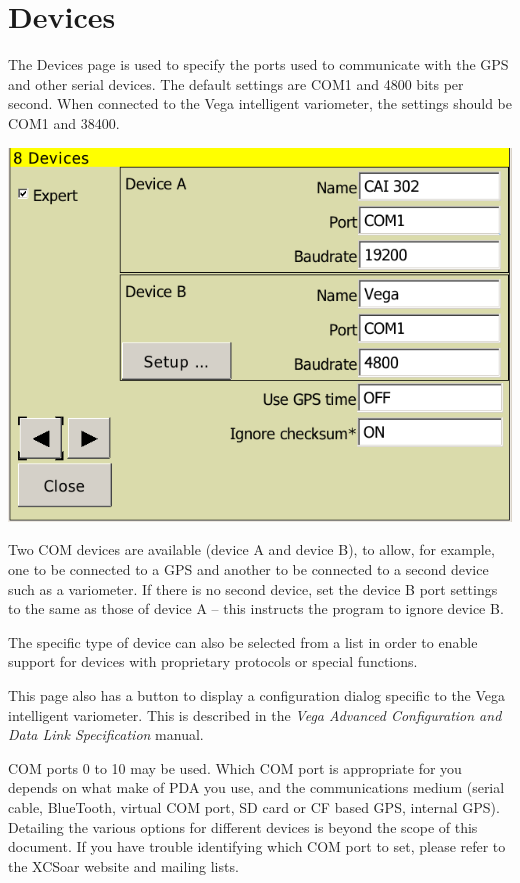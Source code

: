 \documentclass[a4paper,12pt]{refrep}
\begin{document}
\clearpage
\section{Devices}

The Devices page is used to specify the ports used to communicate with
the GPS and other serial devices. The default settings are COM1 and
4800 bits per second.  When connected to the Vega intelligent
variometer, the settings should be COM1 and 38400.

\begin{center}
\includegraphics[angle=0,width=\linewidth,keepaspectratio='true']{figures/config-6.png}
\end{center}

Two COM devices are available (device A and device B), to allow, for
example, one to be connected to a GPS and another to be connected to a
second device such as a variometer.  If there is no second device, set
the device B port settings to the same as those of device A -- this
instructs the program to ignore device B.

The specific type of device can also be selected from a list in order
to enable support for devices with proprietary protocols or special
functions.

This page also has a  button to display a
configuration dialog specific to the Vega intelligent variometer.
This is described in the {\em Vega Advanced Configuration and Data
Link Specification} manual.

COM ports 0 to 10 may be used.  Which COM port is appropriate for you
depends on what make of PDA you use, and the communications medium
(serial cable, BlueTooth, virtual COM port, SD card or CF based GPS,
internal GPS).  Detailing the various options for different devices is
beyond the scope of this document.  If you have trouble identifying
which COM port to set, please refer to the XCSoar website and mailing
lists.
\end{document}
